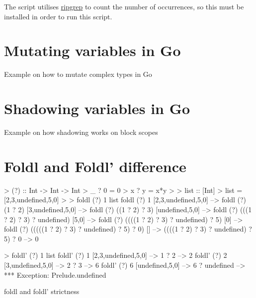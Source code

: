 The script utilises \href{https://github.com/BurntSushi/ripgrep}{ripgrep} to count the number of occurrences, so
this must be installed in order to run this script.

\section{Mutating variables in Go}\label{appendix:mutation}
\begin{code}
	\caption{Example on how to mutate complex types in Go}
\end{code}

\section{Shadowing variables in Go}\label{appendix:shadowing}
\begin{code}
	\caption{Example on how shadowing works on block scopes}
\end{code}

\section{Foldl and Foldl' difference}\label{appendix:foldl-strictness}
\begin{code}
    \begin{haskellcode}
> (?) :: Int -> Int -> Int
> _ ? 0 = 0
> x ? y = x*y
>
> list :: [Int]
> list = [2,3,undefined,5,0]
>
> foldl (?) 1 list
foldl (?) 1 [2,3,undefined,5,0] -->
foldl (?) (1 ? 2) [3,undefined,5,0] -->
foldl (?) ((1 ? 2) ? 3) [undefined,5,0] -->
foldl (?) (((1 ? 2) ? 3) ? undefined) [5,0] -->
foldl (?) ((((1 ? 2) ? 3) ? undefined) ? 5) [0] -->
foldl (?) (((((1 ? 2) ? 3) ? undefined) ? 5) ? 0) [] -->
((((1 ? 2) ? 3) ? undefined) ? 5) ? 0 -->
0

> foldl' (?) 1 list
foldl' (?) 1 [2,3,undefined,5,0] -->
    1 ? 2 --> 2
foldl' (?) 2 [3,undefined,5,0] -->
    2 ? 3 --> 6
foldl' (?) 6 [undefined,5,0] -->
    6 ? undefined -->
*** Exception: Prelude.undefined
    \end{haskellcode}
    \caption{foldl and foldl' strictness\autocite{fold-types}}
\end{code}

